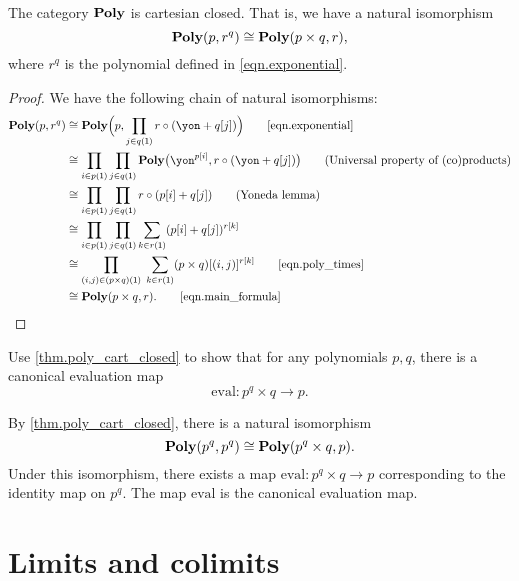 \documentclass[Book-Poly]{subfiles}
\begin{document}
\begin{theorem}\label{thm.poly_cart_closed}
The category $\mathbf{Poly}$ is cartesian closed. That is, we have a natural isomorphism
\[
    \mathbf{Poly}(p,r^q) \cong \mathbf{Poly}(p\times q,r),
\]
where $r^q$ is the polynomial defined in \eqref{eqn.exponential}.
\end{theorem}
\begin{proof}
We have the following chain of natural isomorphisms:
\begin{align*}
	\poly(p, r^q) &\iso
	\poly\Big(p, \prod_{j \in q(\1)} r \circ (\yon+q[j])\Big)
	\tag*{\eqref{eqn.exponential}} \\
	&\iso
	\prod_{i\in p(\1)}\prod_{j\in q(\1)}\poly\big(\yon^{p[i]},r\circ(\yon+q[j])\big)
	\tag{Universal property of (co)products} \\
	&\iso
	\prod_{i\in p(\1)}\prod_{j\in q(\1)}r\circ(p[i]+q[j])
	\tag{Yoneda lemma} \\
	&\iso
	\prod_{i\in p(\1)}\prod_{j\in q(\1)}\sum_{k\in r(\1)}(p[i]+q[j])^{r[k]}
	\\
	&\iso
	\prod_{(i,j) \in (p \times q)(\1)} \; \sum_{k\in r(\1)}(p \times q)[(i, j)]^{r[k]}
	\tag*{\eqref{eqn.poly_times}} \\
	&\iso
	\poly(p \times q,r).
	\tag*{\eqref{eqn.main_formula}}
\end{align*}
\end{proof}

\begin{exercise}
Use \cref{thm.poly_cart_closed} to show that for any polynomials $p,q$, there is a canonical evaluation map
\begin{equation*}%
	\text{eval}\colon p^q \times q \to p.
\end{equation*}
\begin{solution}
By \cref{thm.poly_cart_closed}, there is a natural isomorphism
\[
    \mathbf{Poly}(p^q, p^q) \cong \mathbf{Poly}(p^q \times q, p).
\]
Under this isomorphism, there exists a map $\text{eval} \colon p^q \times q \to p$ corresponding to the identity map on $p^q$.
The map $\text{eval}$ is the canonical evaluation map.
\end{solution}
\end{exercise}


\section{Limits and colimits}
\end{document}
